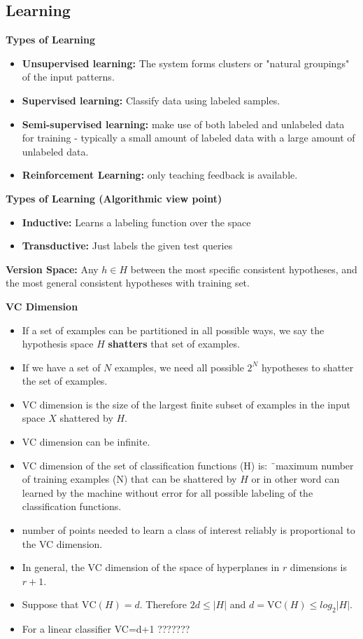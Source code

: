 \documentclass{../cheat}
\begin{document}
\begin{multicols}{3}
		\subsection{Learning}
		\textbf{Types of Learning}
		\begin{itemize}[nolistsep, leftmargin=1em]
			\item \textbf{Unsupervised learning:	} The system forms clusters or "natural groupings" of the input patterns.
			\item \textbf{Supervised learning:} Classify data using labeled samples.
			\item \textbf{Semi-supervised learning:} make use of both labeled and unlabeled data for training - typically a small amount of labeled data with a large amount of unlabeled data.
			\item \textbf{Reinforcement Learning:} only teaching feedback is available.
		\end{itemize}	
		
		\textbf{Types of Learning (Algorithmic view point)}
		\begin{itemize}[nolistsep, leftmargin=1em]
			\item \textbf{Inductive:} Learns a labeling function over the space
			\item \textbf{Transductive:} Just labels the given test queries
		\end{itemize}	
		
		\textbf{Version Space:}
		Any $h \in H$ between the most specific consistent hypotheses, and the most general consistent hypotheses with training set.

		\textbf{VC Dimension}
		\begin{itemize}[nolistsep, leftmargin=1em]
			\item If a set of examples can be partitioned in all possible ways, we say the hypothesis space $H$ \textbf{shatters} that set of examples.
			\item If we have a set of $N$ examples, we need all possible $2^N$ hypotheses to shatter the set of examples.
			\item VC dimension is the size of the largest finite subset of examples in the input space $X$ shattered  by $H$.
			\item VC dimension can be infinite.
			\item VC dimension of the set of classification functions (H) is: ¨maximum number of training examples (N) that can be shattered  by $H$ or in other word can learned by the machine without error for all possible labeling of the classification functions.
			\item number of points needed to learn a class of interest reliably is proportional to the VC dimension.
			\item In general, the VC dimension of  the space of hyperplanes in $r$ dimensions is $r+1$. 
			\item Suppose that $\text{VC}(H) = d$. Therefore $2d \leq |H|$ and $d = \text{VC}(H) \leq log_2 |H|$.
			\item For a linear classifier VC=d+1 ???????
		\end{itemize}
		

\end{multicols}
\end{document}
